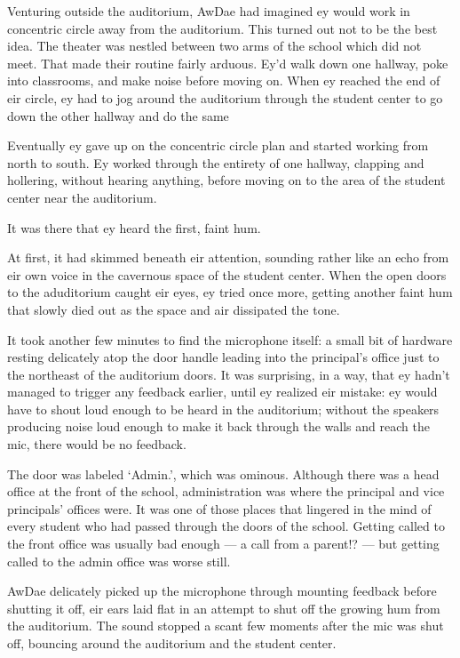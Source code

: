Venturing outside the auditorium, AwDae had imagined ey would work in concentric circle away from the auditorium. This turned out not to be the best idea. The theater was nestled between two arms of the school which did not meet. That made their routine fairly arduous. Ey'd walk down one hallway, poke into classrooms, and make noise before moving on. When ey reached the end of eir circle, ey had to jog around the auditorium through the student center to go down the other hallway and do the same

Eventually ey gave up on the concentric circle plan and started working from north to south. Ey worked through the entirety of one hallway, clapping and hollering, without hearing anything, before moving on to the area of the student center near the auditorium.

It was there that ey heard the first, faint hum.

At first, it had skimmed beneath eir attention, sounding rather like an echo from eir own voice in the cavernous space of the student center. When the open doors to the aduditorium caught eir eyes, ey tried once more, getting another faint hum that slowly died out as the space and air dissipated the tone.

It took another few minutes to find the microphone itself: a small bit of hardware resting delicately atop the door handle leading into the principal's office just to the northeast of the auditorium doors. It was surprising, in a way, that ey hadn't managed to trigger any feedback earlier, until ey realized eir mistake: ey would have to shout loud enough to be heard in the auditorium; without the speakers producing noise loud enough to make it back through the walls and reach the mic, there would be no feedback.

The door was labeled `Admin.', which was ominous. Although there was a head office at the front of the school, administration was where the principal and vice principals' offices were. It was one of those places that lingered in the mind of every student who had passed through the doors of the school. Getting called to the front office was usually bad enough --- a call from a parent!? --- but getting called to the admin office was worse still.

AwDae delicately picked up the microphone through mounting feedback before shutting it off, eir ears laid flat in an attempt to shut off the growing hum from the auditorium. The sound stopped a scant few moments after the mic was shut off, bouncing around the auditorium and the student center.

